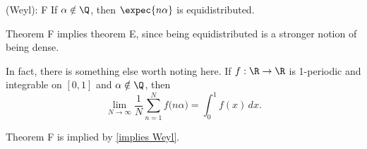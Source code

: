 \begin{ntheorem}{ (Weyl): F}
    If \(\alpha\notin\Q\), then \(\expec{n\alpha}\) is equidistributed.
\end{ntheorem}
\begin{note}
    Theorem F implies theorem E, since being equidistributed is a stronger notion of being dense.
\end{note}
In fact, there is something else worth noting here. If \(f:\R\to\R\) is 1-periodic and integrable on \([0,1]\) and \(\alpha\notin\Q\), then 
    \begin{equation*} 
        \lim_{N\to\infty}\frac{1}{N}\sum_{n=1}^N f\big(n\alpha\big)=\int_0^1 f(x) \, dx.\tag{\(\diamondsuit\)}\label{implies Weyl}
    \end{equation*}
\begin{claim}
    Theorem F is implied by \cref{implies Weyl}.
\end{claim}
